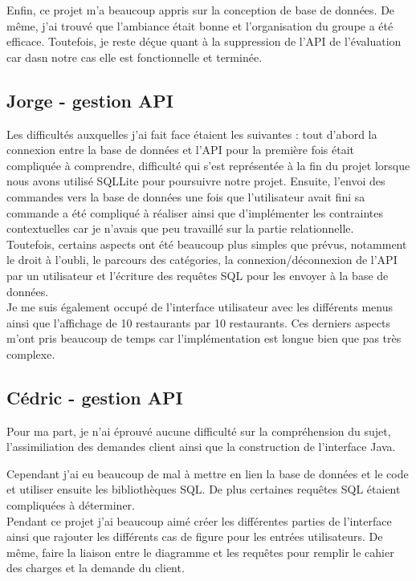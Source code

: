 \documentclass[10pt, a4paper]{article}
\begin{document}
Enfin, ce projet m'a beaucoup appris sur la conception de base de données. De même, j'ai trouvé
que l'ambiance était bonne et l'organisation du groupe a été efficace. Toutefois, je reste déçue
quant à la suppression de l'API de l'évaluation car dasn notre cas elle est fonctionnelle et terminée.

\subsection{Jorge - gestion API}
Les difficultés auxquelles j'ai fait face étaient les suivantes : tout d'abord la connexion entre la base de données
et l'API pour la première fois était compliquée à comprendre, difficulté qui s'est représentée
à la fin du projet lorsque nous avons utilisé SQLLite pour poursuivre notre projet. Ensuite,
l'envoi des commandes vers la base de données une fois que l'utilisateur avait fini sa commande 
a été compliqué à réaliser ainsi que d'implémenter les contraintes contextuelles car je 
n'avais que peu travaillé sur la partie relationnelle. \\

Toutefois, certains aspects ont été beaucoup plus simples que prévus, notamment le droit à l'oubli,
le parcours des catégories, la connexion/déconnexion de l'API par un utilisateur et l'écriture
des requêtes SQL pour les envoyer à la base de données.\\

Je me suis également occupé de l'interface utilisateur avec les différents menus ainsi que l'affichage
de 10 restaurants par 10 restaurants. Ces derniers aspects m'ont pris beaucoup de temps car
l'implémentation est longue bien que pas très complexe.

\subsection{Cédric - gestion API}
Pour ma part, je n'ai éprouvé aucune difficulté sur la compréhension du sujet, l'assimiliation
des demandes client ainsi que la construction de l'interface Java.

Cependant j'ai eu beaucoup de mal à mettre en lien la base de données et le code et utiliser ensuite 
les bibliothèques SQL. De plus certaines requêtes SQL étaient compliquées à déterminer.\\

Pendant ce projet j'ai beaucoup aimé créer les différentes parties de l'interface ainsi 
que rajouter les différents cas de figure pour les entrées utilisateurs. De même, faire la liaison
entre le diagramme et les requêtes pour remplir le cahier des charges et la demande du client.
\end{document}
